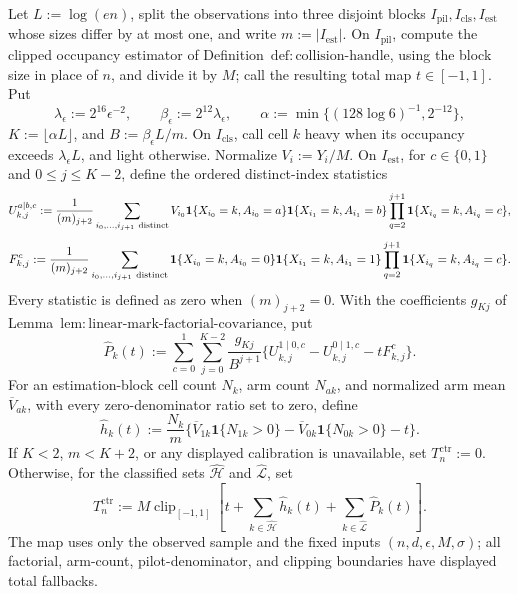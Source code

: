 Let \(L:=\log(en)\), split the observations into three disjoint blocks \(I_{\mathrm{pil}},I_{\mathrm{cls}},I_{\mathrm{est}}\) whose sizes differ by at most one, and write \(m:=|I_{\mathrm{est}}|\).  On \(I_{\mathrm{pil}}\), compute the clipped occupancy estimator of Definition~\(\mathrm{def:collision\text{-}handle}\), using the block size in place of \(n\), and divide it by \(M\); call the resulting total map \(t\in[-1,1]\).  Put
\[
 \lambda_{\epsilon}:=2^{16}\epsilon^{-2},\qquad
 \beta_{\epsilon}:=2^{12}\lambda_{\epsilon},\qquad
 \alpha:=\min\{(128\log 6)^{-1},2^{-12}\},
\]
\(K:=\lfloor\alpha L\rfloor\), and \(B:=\beta_{\epsilon}L/m\).  On \(I_{\mathrm{cls}}\), call cell \(k\) heavy when its occupancy exceeds \(\lambda_{\epsilon}L\), and light otherwise.  Normalize \(V_i:=Y_i/M\).  On \(I_{\mathrm{est}}\), for \(c\in\{0,1\}\) and \(0\le j\le K-2\), define the ordered distinct-index statistics
\[
 U_{k,j}^{a\mid b,c}:=\frac{1}{(m)_{j+2}}
 \sum_{i_0,\ldots,i_{j+1}\ {\rm distinct}}
 V_{i_0}\mathbf 1\{X_{i_0}=k,A_{i_0}=a\}
 \mathbf 1\{X_{i_1}=k,A_{i_1}=b\}
 \prod_{q=2}^{j+1}\mathbf 1\{X_{i_q}=k,A_{i_q}=c\},
\]
\[
 F_{k,j}^{c}:=\frac{1}{(m)_{j+2}}
 \sum_{i_0,\ldots,i_{j+1}\ {\rm distinct}}
 \mathbf 1\{X_{i_0}=k,A_{i_0}=0\}
 \mathbf 1\{X_{i_1}=k,A_{i_1}=1\}
 \prod_{q=2}^{j+1}\mathbf 1\{X_{i_q}=k,A_{i_q}=c\}.
\]
Every statistic is defined as zero when \((m)_{j+2}=0\).  With the coefficients \(g_{Kj}\) of Lemma~\(\mathrm{lem:linear\text{-}mark\text{-}factorial\text{-}covariance}\), put
\[
 \widehat P_k(t):=
 \sum_{c=0}^1\sum_{j=0}^{K-2}\frac{g_{Kj}}{B^{j+1}}
 \{U_{k,j}^{1\mid0,c}-U_{k,j}^{0\mid1,c}-tF_{k,j}^{c}\}.
\]
For an estimation-block cell count \(N_k\), arm count \(N_{ak}\), and normalized arm mean \(\overline V_{ak}\), with every zero-denominator ratio set to zero, define
\[
 \widehat h_k(t):=\frac{N_k}{m}
 \{\overline V_{1k}\mathbf 1\{N_{1k}>0\}
 -\overline V_{0k}\mathbf 1\{N_{0k}>0\}-t\}.
\]
If \(K<2\), \(m<K+2\), or any displayed calibration is unavailable, set \(T_n^{\mathrm{ctr}}:=0\).  Otherwise, for the classified sets \(\widehat{\mathcal H}\) and \(\widehat{\mathcal L}\), set
\[
 T_n^{\mathrm{ctr}}:=M\operatorname{clip}_{[-1,1]}\!\left[
 t+\sum_{k\in\widehat{\mathcal H}}\widehat h_k(t)
 +\sum_{k\in\widehat{\mathcal L}}\widehat P_k(t)
 \right].
\]
The map uses only the observed sample and the fixed inputs \((n,d,\epsilon,M,\sigma)\); all factorial, arm-count, pilot-denominator, and clipping boundaries have displayed total fallbacks.